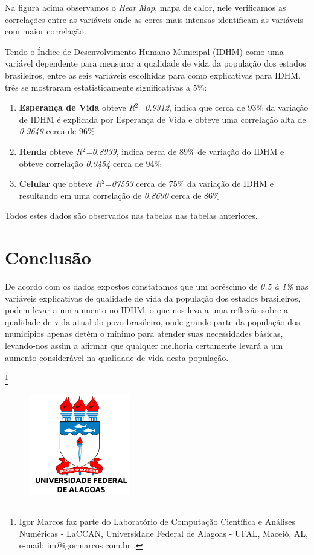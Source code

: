 \documentclass[10pt,foldmark,notumble]{leaflet}
\begin{document}
Na figura acima observamos o \emph{Heat Map}, mapa de calor, nele verificamos as correlações entre as variáveis onde as cores mais intensas identificam as variáveis com maior correlação.

Tendo o Índice de Desenvolvimento Humano Municipal (IDHM) como uma variável dependente para mensurar a qualidade de vida da população dos estados brasileiros, entre as seis variáveis escolhidas para como explicativas para IDHM, três se mostraram estatisticamente significativas a 5\%: 
\begin{enumerate}
\item {\textbf{Esperança de Vida} obteve \emph{R$^2$=0.9312}, indica que cerca de 93\% da variação de IDHM é explicada por Esperança de Vida e obteve uma correlação alta de \emph{0.9649} cerca de 96\%}
\item {\textbf{Renda} obteve \emph{R$^2$=0.8939}, indica cerca de 89\% de variação do IDHM e obteve correlação \emph{0.9454} cerca de 94\%}
\item {\textbf{Celular} que obteve \emph{R$^2$=07553} cerca de 75\% da variação de IDHM e resultando em uma correlação de \emph{0.8690} cerca de 86\%}
\end{enumerate}
Todos estes dados são observados nas tabelas nas tabelas anteriores.

\section{Conclusão}

De acordo com os dados expostos constatamos que um acréscimo de \emph{0.5 à 1\%} nas variáveis explicativas de qualidade de vida da população dos estados brasileiros, podem levar a um aumento no IDHM, o que nos leva a uma reflexão sobre a qualidade de vida atual do povo brasileiro, onde grande parte da população dos municípios apenas detém o mínimo para atender suas necessidades básicas, levando-nos assim a afirmar que qualquer melhoria certamente levará a um aumento considerável na qualidade de vida desta população.


\vspace{60pt}
\footnote{Igor Marcos faz parte do Laboratório de Computação Científica e Análises Numéricas - LaCCAN, Universidade Federal de Alagoas - UFAL, Maceió,
AL, e-mail: im@igormarcos.com.br .}
\nocite{Haq1995}
\nocite{Licia2009}
\nocite{loureiroimpacto}
\nocite{Liana2015}
\nocite{Luciana2007}
\nocite{Ferreira2015}
\nocite{Cruz2016}
\nocite{Ipea2017}
\nocite{IBGE2017}
\nocite{Atlas2017}
\nocite{PNUD2017}
\nocite{FBSP2017}
\nocite{RepoIgor2017}
\pagebreak

\textcolor{white}{
\footnotesize{
		
		
	}
   }
\vspace{50pt}
\begin{figure}[H]
\center
{\includegraphics[scale=0.9]{Images/aau_logo_new_circle-UFAL.pdf}}
\label{UFAL}
\end{figure}
\end{document}
